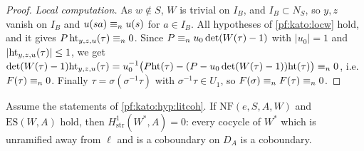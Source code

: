 \begin{proof}
\emph{Local computation.} As $w\notin S$, $W$ is trivial on $I_B$, and $I_B\subset N_S$, so $y,z$ vanish on $I_B$ and
$u(sa)\equiv_{n}u(s)$ for $a\in I_B$. All hypotheses of \cref{pf:kato:locw} hold, and it gives $P\,\mathrm{ht}_{y,z,u}(\tau)\equiv_{n}0$. Since
$P\equiv_{n}u_0\det(W(\tau)-1)$ with $|u_0|=1$ and $|\mathrm{ht}_{y,z,u}(\tau)|\le1$, we get
$\det(W(\tau)-1)\mathrm{ht}_{y,z,u}(\tau)=u_0^{-1}\bigl(P\mathrm{ht}(\tau)-(P-u_0\det(W(\tau)-1))\mathrm{ht}(\tau)\bigr)\equiv_{n}0$, i.e.\ $F(\tau)\equiv_{n}0$.
Finally $\tau=\sigma(\sigma^{-1}\tau)$ with $\sigma^{-1}\tau\in U_1$, so $F(\sigma)\equiv_{n}F(\tau)\equiv_{n}0$.
\end{proof}

\begin{corollary}\label{pf:kato:strict}
Assume the statements of \cref{pf:kato:hyp:litcoh}. If $\mathrm{NF}(e,S,A,W)$ and $\mathrm{ES}(W,A)$ hold, then
$H^1_{\mathrm{str}}(W^*,A)=0$: every cocycle of $W^*$ which is unramified away from $\ell$ and is a coboundary on $D_A$
is a coboundary.
\end{corollary}


